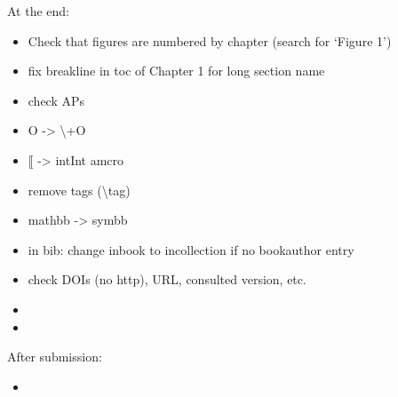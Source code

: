 At the end:
\begin{itemize}
	\item Check that figures are numbered by chapter (search for `Figure 1')
	\item fix breakline in toc of Chapter 1 for long section name
	\item check APs 
	\item O -> \backslash+O
	\item $\lBrack$ -> intInt amcro
	\item remove tags (\textsf{\backslash tag})
	\item mathbb -> symbb
	\item in bib: change inbook to incollection if no bookauthor entry
	\item check DOIs (no http), URL, consulted version, etc.
	\item {}
	\item {}
\end{itemize}

After submission:
\begin{itemize}
	\item {}
\end{itemize}